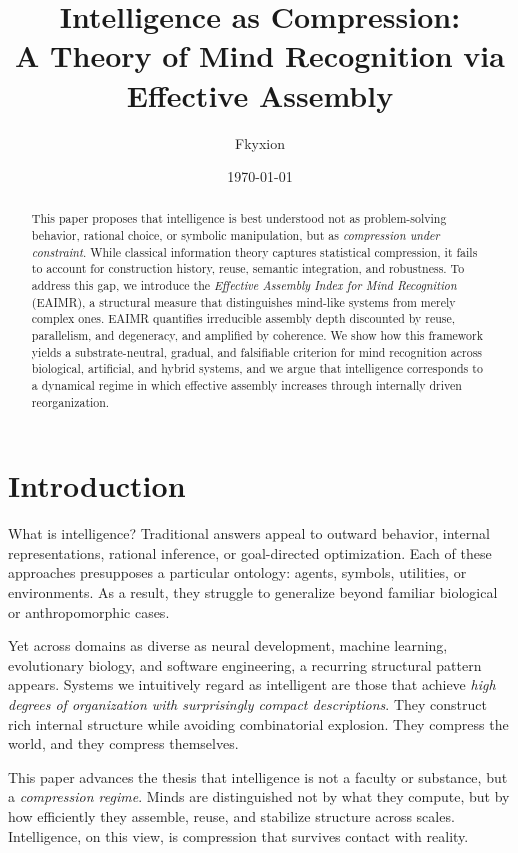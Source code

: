\documentclass[11pt,letterpaper]{article}
\title{Intelligence as Compression:\\
A Theory of Mind Recognition via Effective Assembly}
\author{Fkyxion}
\date{\today}
\begin{document}
\maketitle

\begin{abstract}
This paper proposes that intelligence is best understood not as problem-solving behavior, rational choice, or symbolic manipulation, but as \emph{compression under constraint}. While classical information theory captures statistical compression, it fails to account for construction history, reuse, semantic integration, and robustness. To address this gap, we introduce the \emph{Effective Assembly Index for Mind Recognition} (EAIMR), a structural measure that distinguishes mind-like systems from merely complex ones. EAIMR quantifies irreducible assembly depth discounted by reuse, parallelism, and degeneracy, and amplified by coherence. We show how this framework yields a substrate-neutral, gradual, and falsifiable criterion for mind recognition across biological, artificial, and hybrid systems, and we argue that intelligence corresponds to a dynamical regime in which effective assembly increases through internally driven reorganization.
\end{abstract}

\section{Introduction}

What is intelligence? Traditional answers appeal to outward behavior, internal representations, rational inference, or goal-directed optimization. Each of these approaches presupposes a particular ontology: agents, symbols, utilities, or environments. As a result, they struggle to generalize beyond familiar biological or anthropomorphic cases.

Yet across domains as diverse as neural development, machine learning, evolutionary biology, and software engineering, a recurring structural pattern appears. Systems we intuitively regard as intelligent are those that achieve \emph{high degrees of organization with surprisingly compact descriptions}. They construct rich internal structure while avoiding combinatorial explosion. They compress the world, and they compress themselves.

This paper advances the thesis that intelligence is not a faculty or substance, but a \emph{compression regime}. Minds are distinguished not by what they compute, but by how efficiently they assemble, reuse, and stabilize structure across scales. Intelligence, on this view, is compression that survives contact with reality.
\end{document}
